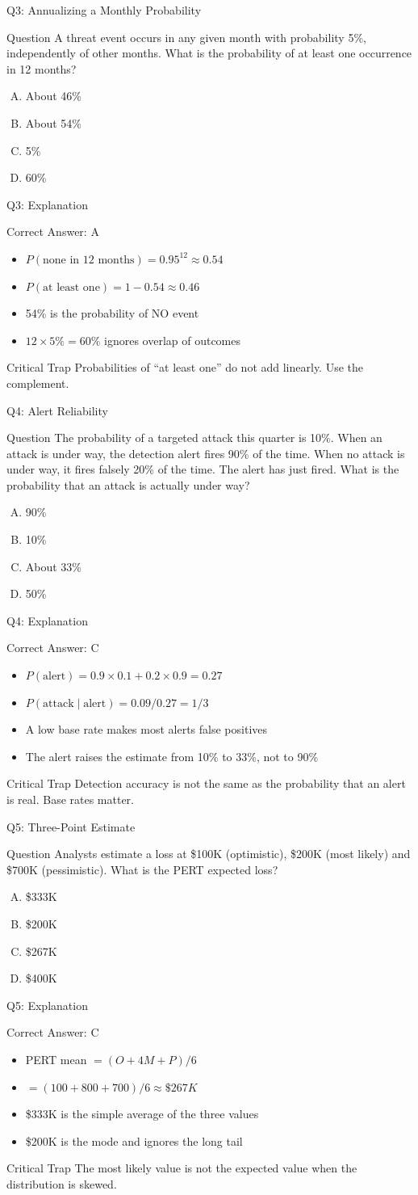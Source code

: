 \documentclass[aspectratio=169]{beamer}
\newcommand{\hq}[7]{%
	\begin{frame}{Q#1: #2}
		\begin{block}{Question}
			#3
		\end{block}
		\begin{enumerate}[(A)]
			#4
		\end{enumerate}
	\end{frame}
	\begin{frame}{Q#1: Explanation}
		\begin{block}{Correct Answer: #5}
			\begin{itemize}
				#6
			\end{itemize}
		\end{block}
		\begin{alertblock}{Critical Trap}
			#7
		\end{alertblock}
	\end{frame}
}
\begin{document}
	\hq{3}{Annualizing a Monthly Probability}
	{A threat event occurs in any given month with probability 5\%, independently of other months. What is the probability of at least one occurrence in 12 months?}
	{\item About 46\%
		\item About 54\%
		\item 5\%
		\item 60\%}
	{A}
	{\item $P(\text{none in 12 months}) = 0.95^{12} \approx 0.54$
		\item $P(\text{at least one}) = 1 - 0.54 \approx 0.46$
		\item 54\% is the probability of NO event
		\item $12 \times 5\% = 60\%$ ignores overlap of outcomes}
	{Probabilities of ``at least one'' do not add linearly. Use the complement.}
	
	\hq{4}{Alert Reliability}
	{The probability of a targeted attack this quarter is 10\%. When an attack is under way, the detection alert fires 90\% of the time. When no attack is under way, it fires falsely 20\% of the time. The alert has just fired. What is the probability that an attack is actually under way?}
	{\item 90\%
		\item 10\%
		\item About 33\%
		\item 50\%}
	{C}
	{\item $P(\text{alert}) = 0.9 \times 0.1 + 0.2 \times 0.9 = 0.27$
		\item $P(\text{attack} \mid \text{alert}) = 0.09 / 0.27 = 1/3$
		\item A low base rate makes most alerts false positives
		\item The alert raises the estimate from 10\% to 33\%, not to 90\%}
	{Detection accuracy is not the same as the probability that an alert is real. Base rates matter.}
	
	\hq{5}{Three-Point Estimate}
	{Analysts estimate a loss at \$100K (optimistic), \$200K (most likely) and \$700K (pessimistic). What is the PERT expected loss?}
	{\item \$333K
		\item \$200K
		\item \$267K
		\item \$400K}
	{C}
	{\item PERT mean $= (O + 4M + P)/6$
		\item $= (100 + 800 + 700)/6 \approx \$267K$
		\item \$333K is the simple average of the three values
		\item \$200K is the mode and ignores the long tail}
	{The most likely value is not the expected value when the distribution is skewed.}
	
\end{document}
